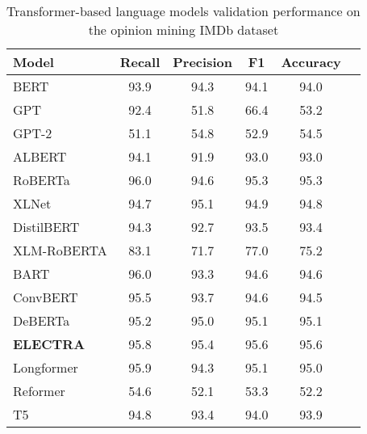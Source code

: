 \documentclass{article}
\begin{document}

\begin{table*}[]
    \centering
    \fontsize{8pt}{10pt}\selectfont
     \caption {Transformer-based language models validation performance on the opinion mining IMDb dataset}
     \label{tab:mainresults}
    \begin{tabular}{lccccc}
        \hline
            Model & Recall & Precision & F1 & Accuracy  \\
        \hline
            BERT             &  93.9    &  94.3    &  94.1    &  94.0    \\
            GPT              &  92.4    &  51.8    &  66.4    &  53.2    \\
            GPT-2            &  51.1    &  54.8    &  52.9    &  54.5    \\
            ALBERT           &  94.1    &  91.9    &  93.0    &  93.0    \\
            RoBERTa          &  96.0    &  94.6    &  \colorbox{top2}{95.3}    &  \colorbox{top2}{95.3}    \\
            XLNet            &  94.7    &  95.1    &  \colorbox{top4}{94.9}    &  94.8    \\
            DistilBERT       &  94.3    &  92.7    &  93.5    &  93.4    \\
            XLM-RoBERTA      &  83.1    &  71.7    &  77.0    &  75.2    \\
            BART             &  96.0    &  93.3    &  94.6    &  94.6    \\
            ConvBERT         &  95.5    &  93.7    &  94.6    &  94.5    \\
            DeBERTa          &  95.2    &  95.0    &  \colorbox{top3}{95.1} &  \colorbox{top3}{95.1}  \\
            \textbf{ELECTRA} &  95.8    &  95.4    &  \colorbox{top1}{95.6} &  \colorbox{top1}{95.6} \\
            Longformer       &  95.9    &  94.3    &  \colorbox{top3}{95.1} &  \colorbox{top4}{95.0}    \\
            Reformer         &  54.6    &  52.1    &  53.3    &  52.2    \\
            T5               &  94.8    &  93.4    &  94.0    &  93.9    \\
        \hline
    \end{tabular}  
\end{table*}
\end{document}
